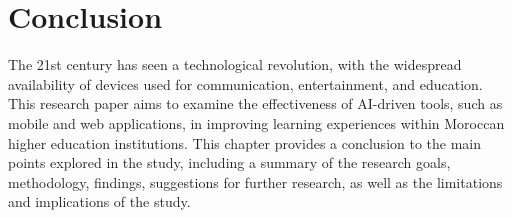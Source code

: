 \section{Conclusion}

The 21st century has seen a technological revolution, with the widespread availability
of devices used for communication, entertainment, and education. This research paper
aims to examine the effectiveness of AI-driven tools, such as mobile and web applications,
in improving learning experiences within Moroccan higher education institutions. 
This chapter provides a conclusion to the main points explored in the study, 
including a summary of the research goals, methodology, findings, suggestions 
for further research, as well as the limitations and implications of the study.

